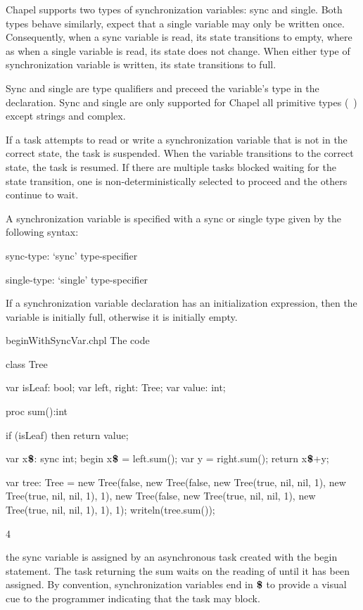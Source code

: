 Chapel supports two types of synchronization variables: sync and
single.  Both types behave similarly, expect that a single variable
may only be written once.  Consequently, when a sync variable is read,
its state transitions to empty, where as when a single variable is
read, its state does not change.  When either type of synchronization
variable is written, its state transitions to full.

Sync and single are type qualifiers and preceed the variable's type in
the declaration.  Sync and single are only supported for Chapel all
primitive types (~) except strings and complex.

If a task attempts to read or write a synchronization variable that is
not in the correct state, the task is suspended.  When the variable
transitions to the correct state, the task is resumed.  If there are
multiple tasks blocked waiting for the state transition, one is
non-deterministically selected to proceed and the others continue to
wait.

A synchronization variable is specified with a sync or single type
given by the following syntax:
\begin{syntax}
sync-type:
  `sync' type-specifier

single-type:
  `single' type-specifier
\end{syntax}

If a synchronization variable declaration has an initialization
expression, then the variable is initially full, otherwise it is
initially empty.

\begin{chapelexample}{beginWithSyncVar.chpl}
The code
\begin{chapel}
class Tree {
  var isLeaf: bool;
  var left, right: Tree;
  var value: int;

  proc sum():int {
    if (isLeaf) then 
       return value;

    var x$\mbox{{\bf \$}}$: sync int;
    begin x$\mbox{{\bf \$}}$ = left.sum();
    var y = right.sum();
    return x$\mbox{{\bf \$}}$+y;
  }
}
\end{chapel}
\begin{chapelpost}
var tree: Tree = new Tree(false, new Tree(false, new Tree(true, nil, nil, 1),
                                                 new Tree(true, nil, nil, 1), 1),
                                 new Tree(false, new Tree(true, nil, nil, 1),
                                                 new Tree(true, nil, nil, 1), 1), 1);
writeln(tree.sum());
\end{chapelpost}
\begin{chapeloutput}
4
\end{chapeloutput}
the sync variable  is assigned by an
asynchronous task created with the begin statement.  The task
returning the sum waits on the reading of 
until it has been assigned.  By convention, synchronization variables
end in $\mbox{{\bf \$}}$ to provide a visual cue to the programmer
indicating that the task may block.
\end{chapelexample}

